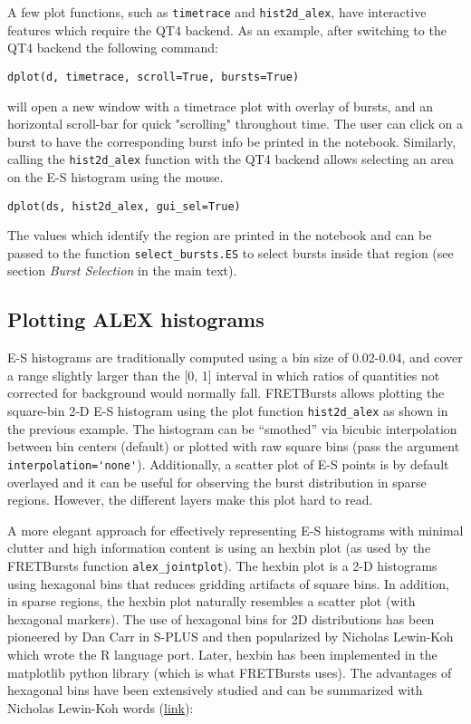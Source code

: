 A few plot functions, such as \verb|timetrace| and \verb|hist2d_alex|, have interactive features
which require the QT4 backend. As an example, after switching to the QT4 backend
the following command:

\begin{lstlisting}
dplot(d, timetrace, scroll=True, bursts=True)
\end{lstlisting}

\noindent
will open a new window with a timetrace plot with overlay of bursts, and an horizontal scroll-bar for quick
"scrolling" throughout time. The user can click on a burst to have the corresponding burst info
be printed in the notebook.
Similarly, calling the \verb|hist2d_alex| function with the QT4 backend allows
selecting an area on the E-S histogram using the mouse.

\begin{lstlisting}
dplot(ds, hist2d_alex, gui_sel=True)
\end{lstlisting}

The values which identify the region are printed in the notebook and can be passed
to the function \verb|select_bursts.ES| to select bursts inside that region
(see section \textit{Burst Selection} in the main text).

\subsection*{Plotting ALEX histograms}
E-S histograms are traditionally computed using a bin size of 0.02-0.04, 
and cover a range slightly larger than the [0, 1] interval in which ratios of 
quantities not corrected for background would normally fall. 
FRETBursts allows plotting the square-bin 2-D E-S histogram using the plot
function \verb|hist2d_alex| as shown in the previous example.
The histogram can be ``smothed'' via bicubic interpolation between bin centers
(default) or plotted with raw square bins (pass the argument 
\verb|interpolation='none'|). Additionally, a scatter plot of E-S
points is by default overlayed and it can be useful for observing
the burst distribution in sparse regions. However, the different layers
make this plot hard to read. 

A more elegant approach for effectively representing E-S histograms with minimal
clutter and high information content is using an hexbin plot 
(as used by the FRETBursts function \verb|alex_jointplot|). The hexbin plot 
is a 2-D histograms using hexagonal bins that reduces
gridding artifacts of square bins. In addition, in sparse regions, the hexbin 
plot naturally resembles a scatter plot (with hexagonal markers).
The use of hexagonal bins for 2D distributions 
has been pioneered by Dan Carr in S-PLUS and then popularized by Nicholas Lewin-Koh
which wrote the R language port. Later, hexbin has been implemented in the 
matplotlib python library (which is what FRETBursts uses). The advantages of 
hexagonal bins have been extensively studied and can be summarized with 
Nicholas Lewin-Koh words (\href{https://cran.r-project.org/web/packages/hexbin/vignettes/hexagon_binning.pdf}{link}):

